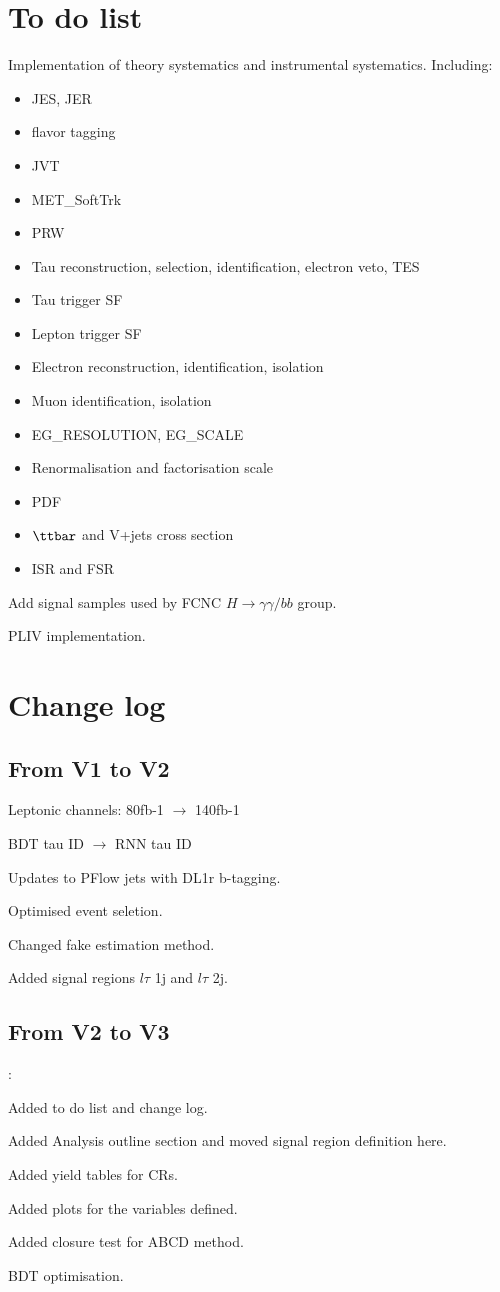 \section{To do list}

Implementation of theory systematics and instrumental systematics. Including:

\begin{itemize}
	\item JES, JER
	\item flavor tagging
	\item JVT
	\item MET_SoftTrk
	\item PRW
	\item Tau reconstruction, selection, identification, electron veto, TES
	\item Tau trigger SF
	\item Lepton trigger SF
	\item Electron reconstruction, identification, isolation
	\item Muon identification, isolation
	\item EG_RESOLUTION, EG_SCALE
	\item Renormalisation and factorisation scale
	\item PDF
	\item $\ttbar$ and V+jets cross section
	\item ISR and FSR
\end{itemize}

Add signal samples used by FCNC $H\to \gamma\gamma/bb$ group.

PLIV implementation.

\section{Change log}

\subsection{From V1 to V2}

Leptonic channels:  80fb-1 $\to$ 140fb-1

BDT tau ID $\to$ RNN tau ID

Updates to PFlow jets with DL1r b-tagging.

Optimised event seletion.

Changed fake estimation method.

Added signal regions $l\tau$ 1j and $l\tau$ 2j.

\subsection{From V2 to V3}:

Added to do list and change log.

Added Analysis outline section and moved signal region definition here.

Added yield tables for CRs.

Added plots for the variables defined.

Added closure test for ABCD method.

BDT optimisation.